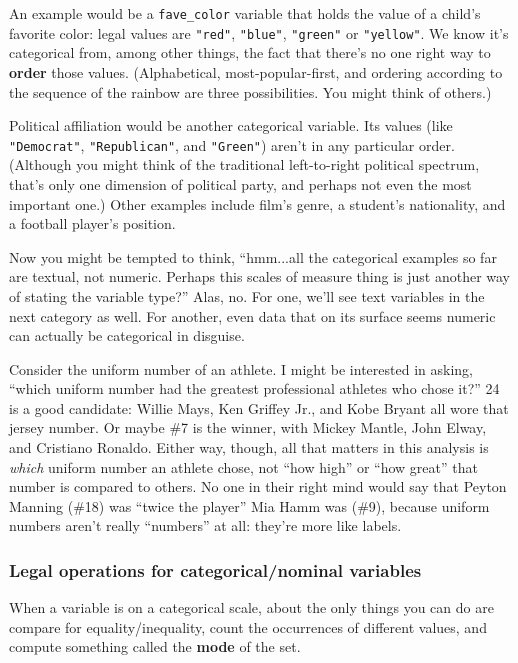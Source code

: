 An example would be a \texttt{fave\_color} variable that holds the value of a
child's favorite color: legal values are \texttt{"red"}, \texttt{"blue"},
\texttt{"green"} or \texttt{"yellow"}. We know it's categorical from, among
other things, the fact that there's no one right way to \textbf{order} those
values. (Alphabetical, most-popular-first, and ordering according to the
sequence of the rainbow are three possibilities. You might think of others.)

Political affiliation would be another categorical variable. Its values (like
\texttt{"Democrat"}, \texttt{"Republican"}, and \texttt{"Green"}) aren't in any
particular order. (Although you might think of the traditional left-to-right
political spectrum, that's only one dimension of political party, and perhaps
not even the most important one.) Other examples include film's genre, a
student's nationality, and a football player's position.

Now you might be tempted to think, ``hmm...all the categorical examples so far
are textual, not numeric. Perhaps this scales of measure thing is just another
way of stating the variable type?'' Alas, no. For one, we'll see text variables
in the next category as well. For another, even data that on its surface seems
numeric can actually be categorical in disguise.

Consider the uniform number of an athlete. I might be interested in asking,
``which uniform number had the greatest professional athletes who chose it?''
24 is a good candidate: Willie Mays, Ken Griffey Jr., and Kobe Bryant all wore
that jersey number. Or maybe \#7 is the winner, with Mickey Mantle, John Elway,
and Cristiano Ronaldo. Either way, though, all that matters in this analysis is
\textit{which} uniform number an athlete chose, not ``how high'' or ``how
great'' that number is compared to others. No one in their right mind would say
that Peyton Manning (\#18) was ``twice the player'' Mia Hamm was (\#9), because
uniform numbers aren't really ``numbers'' at all: they're more like labels.

\subsubsection{Legal operations for categorical/nominal variables}

When a variable is on a categorical scale, about the only things you can do are
compare for equality/inequality, count the occurrences of different values, and
compute something called the \textbf{mode} of the set.

